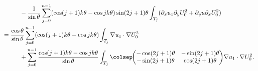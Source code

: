 \begin{align*}
&\hspace*{1cm}-\frac{1}{\sin \theta}\sum_{j=0}^{n-1} (\cos(j+1)k\theta-\cos jk\theta)\sin(2j+1)\theta
\int_{T_j} (\partial_x u_1 \partial_y U_0^2 + \partial_y u \partial_x U_0^2)\\
&=\frac{\cos \theta}{\sin \theta}\sum_{j=0}^{n-1} (\cos(j+1)k\theta-\cos jk\theta) \int_{T_j} \nabla u_1 \cdot \nabla U_0^2\\
&\hspace*{1cm}+ \sum_{j=0}^{n-1} \frac{\cos(j+1)k\theta-\cos jk\theta}{\sin \theta} \int_{T_j}\colsep\hspace*{-1mm}
\begin{pmatrix}
-\cos(2j+1)\theta & -\sin(2j+1)\theta \\
-\sin(2j+1)\theta & \cos(2j+1)\theta
\end{pmatrix}\!\nabla u_1 \cdot \nabla U_0^2.
\end{align*}
\egroup\newpage

